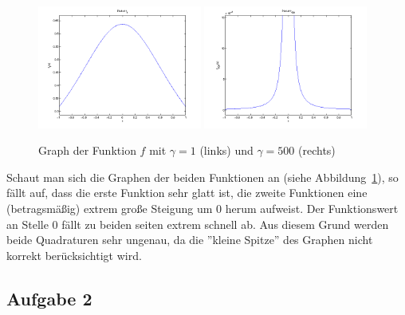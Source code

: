 \documentclass[11pt,a4paper,ngerman]{article}
\begin{document}
\begin{figure}[h!]
\centering
\includegraphics[width=0.48\textwidth]{f1.png}
\includegraphics[width=0.48\textwidth]{f2.png}
\caption{Graph der Funktion $f$ mit $\gamma = 1$ (links) und $\gamma = 500$ (rechts) \label{fig:f}}
\end{figure}

Schaut man sich die Graphen der beiden Funktionen an (siehe Abbildung~\ref{fig:f}), so fällt auf, dass die erste Funktion sehr glatt ist, die zweite Funktionen eine (betragsmäßig) extrem große Steigung um 0 herum aufweist. Der Funktionswert an Stelle 0 fällt zu beiden seiten extrem schnell ab. Aus diesem Grund werden beide Quadraturen sehr ungenau, da die ''kleine Spitze'' des Graphen nicht korrekt berücksichtigt wird.

\subsection*{Aufgabe 2}


\label{LastPage}
\end{document}

